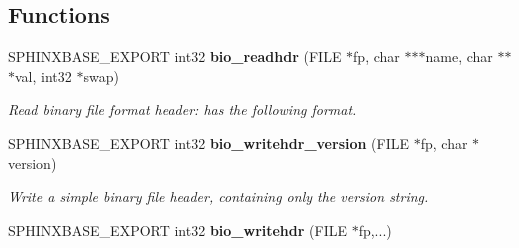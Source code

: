 \subsection*{\-Functions}
\begin{DoxyCompactItemize}
\item 
\-S\-P\-H\-I\-N\-X\-B\-A\-S\-E\-\_\-\-E\-X\-P\-O\-R\-T int32 {\bf bio\-\_\-readhdr} (\-F\-I\-L\-E $\ast$fp, char $\ast$$\ast$$\ast$name, char $\ast$$\ast$$\ast$val, int32 $\ast$swap)
\begin{DoxyCompactList}\small\item\em \-Read binary file format header\-: has the following format. \end{DoxyCompactList}\item 
\-S\-P\-H\-I\-N\-X\-B\-A\-S\-E\-\_\-\-E\-X\-P\-O\-R\-T int32 {\bf bio\-\_\-writehdr\-\_\-version} (\-F\-I\-L\-E $\ast$fp, char $\ast$version)
\begin{DoxyCompactList}\small\item\em \-Write a simple binary file header, containing only the version string. \end{DoxyCompactList}\item 
\-S\-P\-H\-I\-N\-X\-B\-A\-S\-E\-\_\-\-E\-X\-P\-O\-R\-T int32 {\bfseries bio\-\_\-writehdr} (\-F\-I\-L\-E $\ast$fp,...)\label{bio_8h_adc41fc6124fa3e52267c0a2c1036246f}


\end{DoxyCompactItemize}
